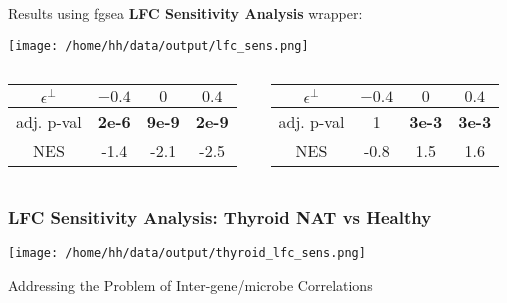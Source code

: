 \documentclass[11pt]{beamer}
\begin{document}
\begin{frame}
  \vspace{10px}
  Results using fgsea \textbf{LFC Sensitivity Analysis} wrapper:
  \begin{center}
    \texttt{[image: /home/hh/data/output/lfc\_sens.png]}
  \end{center}
  \begin{columns}
    \begin{column}{0.5\textwidth}
      \begin{center}
        \begin{tabular}{ |c|c|c|c| } 
        \hline
        \(\epsilon^\perp\) & \(-0.4\) & \(0\) & \(0.4\) \\
        \hline
        adj. p-val & \textbf{2e-6} & \textbf{9e-9} & \textbf{2e-9} \\
        \hline
        NES & -1.4 & -2.1 & -2.5 \\
        \hline
        \end{tabular}
      \end{center}
    \end{column}
    \vrule{}
    \begin{column}{0.5\textwidth}  %
      \begin{center}
        \begin{tabular}{ |c|c|c|c| } 
        \hline
        \(\epsilon^\perp\) & \(-0.4\) & \(0\) & \(0.4\) \\
        \hline
        adj. p-val & 1 & \textbf{3e-3} & \textbf{3e-3} \\
        \hline
        NES & -0.8 & 1.5 & 1.6 \\
        \hline
        \end{tabular}
      \end{center}
    \end{column}
   \end{columns}
\end{frame}

\begin{frame}
  \frametitle{LFC Sensitivity Analysis: Thyroid NAT vs Healthy}
   \begin{center}
    \texttt{[image: /home/hh/data/output/thyroid\_lfc\_sens.png]}
  \end{center}
\end{frame}

\begin{frame}
  \begin{center}
    Addressing the Problem of Inter-gene/microbe Correlations
  \end{center}
\end{frame}
\end{document}
